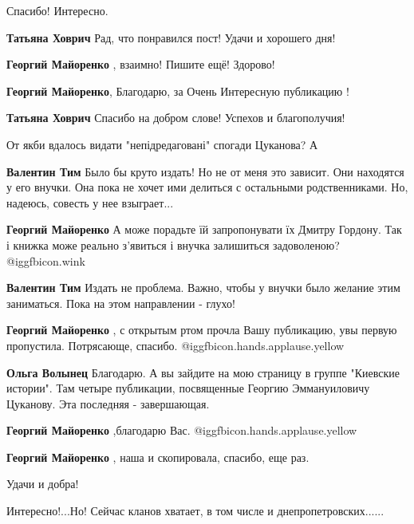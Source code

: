 \begin{itemize}
Спасибо! Интересно.

\begin{itemize} %
\textbf{Татьяна Ховрич} Рад, что понравился пост! Удачи и хорошего дня!

\textbf{Георгий Майоренко} , взаимно! Пишите ещё! Здорово!

\textbf{Георгий Майоренко}, Благодарю, за Очень Интересную публикацию !

\textbf{Татьяна Ховрич} Спасибо на добром слове! Успехов и благополучия!
\end{itemize} %

От якби вдалось видати "непідредаговані" спогади Цуканова? А

\begin{itemize} %
\textbf{Валентин Тим} Было бы круто издать! Но не от меня это зависит. Они находятся у его внучки. Она пока не хочет ими делиться с остальными родственниками. Но, надеюсь, совесть у нее взыграет...

\textbf{Георгий Майоренко} А може порадьте їй запропонувати їх Дмитру Гордону. Так і книжка може реально з'явиться і внучка залишиться задоволеною? @igg{fbicon.wink} 

\textbf{Валентин Тим} Издать не проблема. Важно, чтобы у внучки было желание этим заниматься. Пока на этом направлении - глухо!
\end{itemize} %

\textbf{Георгий Майоренко} , с открытым ртом прочла Вашу публикацию, увы первую пропустила. Потрясающе, спасибо. @igg{fbicon.hands.applause.yellow} 

\begin{itemize} %
\textbf{Ольга Волынец} Благодарю. А вы зайдите на мою страницу в группе "Киевские истории". Там четыре публикации, посвященные Георгию Эммануиловичу Цуканову. Эта последняя - завершающая.

\textbf{Георгий Майоренко} ,благодарю Вас. @igg{fbicon.hands.applause.yellow} 

\textbf{Георгий Майоренко} , наша и скопировала, спасибо, еще раз.

Удачи и добра!
\end{itemize} %

Интересно!...Но! Сейчас кланов хватает, в том числе и днепропетровских......


\end{itemize}
